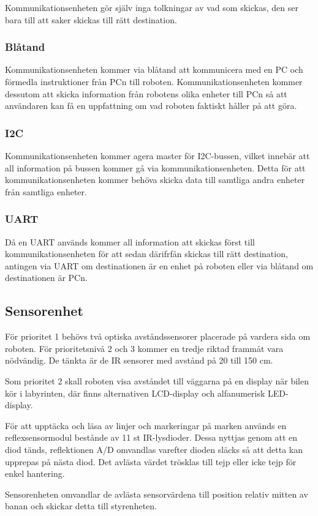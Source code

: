 \documentclass[a4paper,12pt]{article}
\begin{document}
Kommunikationsenheten gör själv inga tolkningar av vad som skickas, den ser bara
till att saker skickas till rätt destination.
\subsubsection{Blåtand}
Kommunikationsenheten kommer via blåtand att kommunicera med en PC och förmedla
instruktioner från PCn till roboten. Kommunikationsenheten kommer dessutom att
skicka information från robotens olika enheter till PCn så att användaren kan få
en uppfattning om vad roboten faktiskt håller på att göra.
\subsubsection{I2C}
Kommunikationsenheten kommer agera master för I2C-bussen, vilket innebär att all
information på bussen kommer gå via kommunikationsenheten. Detta för att
kommunikationsenheten kommer behöva skicka data till samtliga andra enheter från
samtliga enheter.
\subsubsection{UART}
Då en UART används kommer all information att skickas först till
kommunikationsenheten för att sedan därifrfån skickas till rätt destination,
antingen via UART om destinationen är en enhet på roboten eller via blåtand om
destinationen är PCn.


\subsection{Sensorenhet}
För prioritet 1 behövs två  optiska avståndssensorer placerade på vardera sida om roboten. För prioritetsnivå 2 och 3 kommer en tredje riktad frammåt vara nödvändig. De tänkta är de IR sensorer med avstånd på 20 till 150 cm. 

Som prioritet 2 skall roboten visa avståndet till väggarna på en display när bilen kör i labyrinten, där finns alternativen LCD-display och alfanumerisk LED-display.

För att upptäcka och läsa av linjer och markeringar på marken används en reflexsensormodul bestånde av 11 st IR-lysdioder. Dessa nyttjas genom att en diod tänds, reflektionen A/D omvandlas varefter dioden släcks så att detta kan upprepas på nästa diod. Det avlästa värdet trösklas till tejp eller icke tejp för enkel hantering.

Sensorenheten omvandlar de avlästa sensorvärdena till position relativ mitten av banan och skickar detta till styrenheten.
\end{document}
